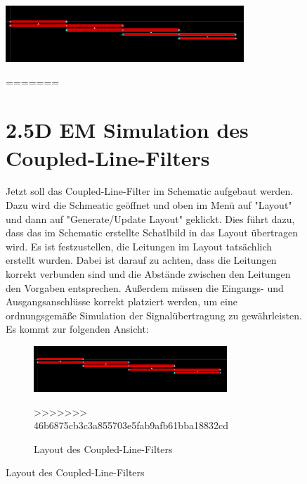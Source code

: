 \begin{figure}[H]
    \centering
    \includegraphics[width=0.8\textwidth]{Pictures/LayoutohneKnick.png}
    \caption{Schematic des Coupled-Line-Filters}
=======
\section{2.5D EM Simulation des Coupled-Line-Filters}

Jetzt soll das Coupled-Line-Filter im Schematic aufgebaut werden. Dazu wird die Schmeatic geöffnet und oben im Menü auf "Layout" und dann auf "Generate/Update Layout" geklickt. Dies führt dazu, dass das im Schematic erstellte Schatlbild in das Layout übertragen wird. Es ist festzustellen, die Leitungen im Layout tatsächlich erstellt wurden. Dabei ist darauf zu achten, dass die Leitungen korrekt verbunden sind und die Abstände zwischen den Leitungen den Vorgaben entsprechen. Außerdem müssen die Eingangs- und Ausgangsanschlüsse korrekt platziert werden, um eine ordnungsgemäße Simulation der Signalübertragung zu gewährleisten.
Es kommt zur folgenden Ansicht:
\begin{figure}[H]
    \centering
    \includegraphics[width=0.8\textwidth]{Pictures/Layout ohne Knick.png}
    \caption{Layout des Coupled-Line-Filters}
>>>>>>> 46b6875cb3c3a855703e5fab9afb61bba18832cd
\end{figure}


\end{figure}
